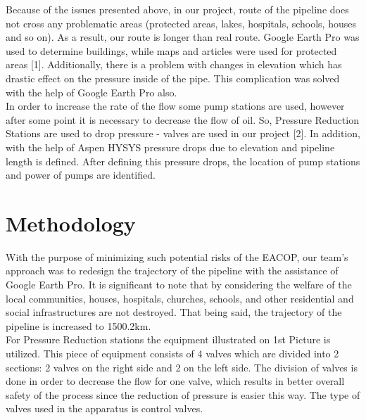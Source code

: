 \documentclass[12pt]{article}
\begin{document}
{\fontsize{12pt}{12pt}\selectfont  
\hspace*{1em} Because of the issues presented above, in our project, route of the pipeline does not cross any problematic areas (protected areas, lakes, hospitals, schools, houses and so on). As a result, our route is longer than real route. Google Earth Pro was used to determine buildings, while maps and articles were used for protected areas [1]. Additionally, there is a problem with changes in elevation which has drastic effect on the pressure inside of the pipe. This complication was solved with the help of Google Earth Pro also.
\\

In order to increase the rate of the flow some pump stations are used, however after some point it is necessary to decrease the flow of oil. So, Pressure Reduction Stations are used to drop pressure - valves are used in our project [2].  In addition, with the help of Aspen HYSYS pressure drops due to elevation and pipeline length is defined. After defining this pressure drops, the location of pump stations and power of pumps are identified.
\\

}

\section*{Methodology}

{\fontsize{12pt}{12pt}\selectfont  
\hspace*{1em} With the purpose of minimizing such potential risks of the EACOP, our team's approach was to redesign the trajectory of the pipeline with the assistance of Google Earth Pro. It is significant to note that by considering the welfare of the local communities, houses, hospitals, churches, schools, and other residential and social infrastructures are not destroyed. That being said, the trajectory of the pipeline is increased to 1500.2km. 
\\

For Pressure Reduction stations the equipment illustrated on 1st Picture is utilized. This piece of equipment consists of 4 valves which are divided into 2 sections: 2 valves on the right side and 2 on the left side. The division of valves is done in order to decrease the flow for one valve, which results in better overall safety of the process since the reduction of pressure is easier this way. The type of valves used in the apparatus is control valves.
\\




}
\end{document}
